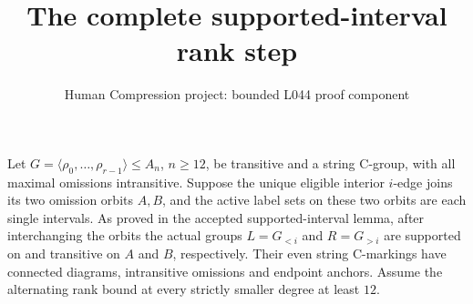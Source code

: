 \documentclass[10pt,a4paper]{article}
\title{The complete supported-interval rank step}
\author{Human Compression project: bounded L044 proof component}
\date{}
\newcommand{\gen}[1]{\langle#1\rangle}
\begin{document}
\maketitle
Let $G=\gen{\rho_0,\ldots,\rho_{r-1}}\leq A_n$, $n\geq12$,
be transitive and a string C-group, with all maximal omissions
intransitive. Suppose the unique eligible interior $i$-edge
joins its two omission orbits $A,B$, and the active label sets
on these two orbits are each single intervals.
As proved in the accepted supported-interval lemma, after
interchanging the orbits the actual groups
$L=G_{<i}$ and $R=G_{>i}$ are supported on and transitive
on $A$ and $B$, respectively. Their even string C-markings
have connected diagrams, intransitive omissions and endpoint
anchors. Assume the alternating rank bound at every strictly
smaller degree at least $12$.
\end{document}

